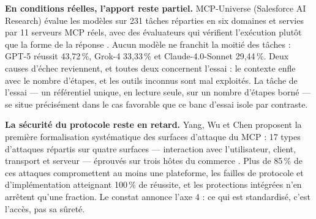 \textbf{En conditions réelles, l'apport reste partiel.} MCP-Universe (Salesforce AI Research) évalue les modèles sur 231 tâches réparties en six domaines et servies par 11 serveurs MCP réels, avec des évaluateurs qui vérifient l'exécution plutôt que la forme de la réponse \cite{mcpuniverse}. Aucun modèle ne franchit la moitié des tâches : GPT-5 réussit 43,72\,\%, Grok-4 33,33\,\% et Claude-4.0-Sonnet 29,44\,\%. Deux causes d'échec reviennent, et toutes deux concernent l'essai : le contexte enfle avec le nombre d'étapes, et les outils inconnus sont mal exploités. La tâche de l'essai --- un référentiel unique, en lecture seule, sur un nombre d'étapes borné --- se situe précisément dans le cas favorable que ce banc d'essai isole par contraste.

\textbf{La sécurité du protocole reste en retard.} Yang, Wu et Chen proposent la première formalisation systématique des surfaces d'attaque du MCP : 17 types d'attaques répartis sur quatre surfaces --- interaction avec l'utilisateur, client, transport et serveur --- éprouvés sur trois hôtes du commerce \cite{mcpsecbench}. Plus de 85\,\% de ces attaques compromettent au moins une plateforme, les failles de protocole et d'implémentation atteignant 100\,\% de réussite, et les protections intégrées n'en arrêtent qu'une fraction. Le constat annonce l'axe 4 : ce qui est standardisé, c'est l'accès, pas sa sûreté.


